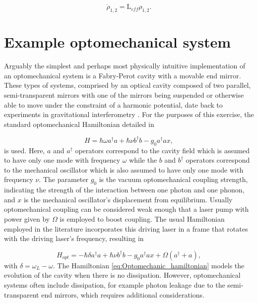 \documentclass[12pt]{article}
\begin{document}
\begin{equation}
    \dot{\rho}_{1,2}=\mathrm{L}_{eff}\rho_{1,2}.
\end{equation} 


\section{Example optomechanical system}\label{sec:ExampleSystem}

Arguably the simplest and perhaps most physically intuitive implementation of an optomechanical system is a Fabry-Perot cavity with a movable end mirror. These types of systems, comprised by an optical cavity composed of two parallel, semi-transparent mirrors with one of the mirrors being suspended or otherwise able to move under the constraint of a harmonic potential, date back to experiments in gravitational interferometry \cite{AbramoviciLIGO1992}. For the purposes of this exercise,  the standard optomechanical Hamiltonian detailed in \cite{LawMovingMirror1995}

\begin{equation}\label{eq:basic_hamiltonian}
    H=\hbar \omega a^\dagger a + \hbar\nu b^\dagger b - g_0 a^\dagger a x,
\end{equation}  is used. Here, $a$ and $a^\dagger$ operators correspond to the cavity field which is assumed to have only one mode with frequency $\omega$ while the $b$ and $b^\dagger$ operators correspond to the mechanical oscillator which is also assumed to have only one mode with frequency $\nu$. The parameter $g_0$ is the vacuum optomechanical coupling strength, indicating the strength of the interaction between one photon and one phonon, and $x$ is the mechanical oscillator's displacement from equilibrium.  Usually optomechanical coupling can be considered weak enough that a laser pump with power given by $\Omega$ is employed to boost coupling. The usual Hamiltonian employed in the literature incorporates this driving laser in a frame that rotates with the driving laser's frequency, resulting in

\begin{equation}\label{eq:Optomechanic_hamiltonian}
    H_{opt}=-\hbar \delta a^\dagger a + \hbar\nu b^\dagger b - g_0 a^\dagger a x + \Omega(a^\dagger+a),
\end{equation} with $\delta = \omega_L-\omega$. The Hamiltonian \eqref{eq:Optomechanic_hamiltonian} models the evolution of the cavity when there is no dissipation. However, optomechanical systems often include dissipation, for example photon leakage due to the semi-transparent end mirrors, which requires additional considerations.
\end{document}
